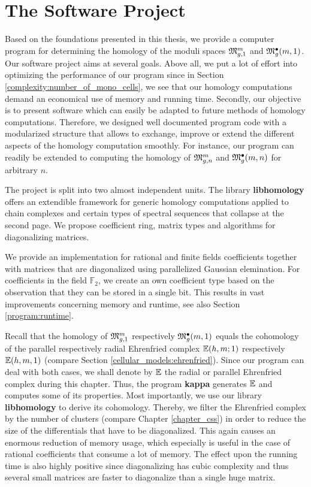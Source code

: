 \chapter{The Software Project}
\label{program}

Based on the foundations presented in this thesis, 
we provide a computer program for determining the homology of the moduli spaces $\Modspc[1]$ and $\ModspcRad[1]$.
Our software project aims at several goals.
Above all, we put a lot of effort into optimizing the performance of our program
since in Section \ref{complexity:number_of_mono_cells}, we see that our homology computations demand 
an economical use of memory and running time.  
Secondly, our objective is to present software which can easily be adapted to future methods of homology computations. 
Therefore, we designed well documented program code with a modularized structure 
that allows to exchange, improve or extend the different aspects of the homology computation smoothly.
For instance, our program can readily be extended to computing the homology of $\Modspc$ and $\ModspcRad$ for arbitrary $n$.

The project is split into two almost independent units.
The library {\bfseries libhomology} offers an extendible framework for generic homology computations applied to chain complexes and certain types of spectral sequences that collapse at the second page.
We propose coefficient ring, matrix types and algorithms for diagonalizing matrices.

We provide an implementation for rational and finite fields coefficients together with matrices that are diagonalized using parallelized Gaussian elemination.
For coefficients in the field $\mathbb F_2$, we create an own coefficient type based on the observation that they can be stored in a single bit.
This results in vast improvements concerning memory and runtime, see also Section \ref{program:runtime}.

Recall that the homology of $\Modspc[1]$ respectively $\ModspcRad[1]$ equals the cohomology of the parallel respectively radial Ehrenfried complex $\E(h, m;1)$ respectively $\E(h, m, 1)$
(compare Section \ref{cellular_models:ehrenfried}).
Since our program can deal with both cases, we shall denote by $\Ehrprog$ the radial or parallel Ehrenfried complex during this chapter.
Thus, the program {\bfseries kappa} generates $\Ehrprog$ and computes some of its properties.
Most importantly, we use our library {\bfseries libhomology} to derive its cohomology.
Thereby, we filter the Ehrenfried complex by the number of clusters (compare Chapter \ref{chapter_css})
in order to reduce the size of the differentials that have to be diagonalized.
This again causes an enormous reduction of memory usage, 
which especially is useful in the case of rational coefficients that consume a lot of memory. 
The effect upon the running time is also highly positive 
since diagonalizing has cubic complexity and thus several small matrices are faster to diagonalize than a single huge matrix.

